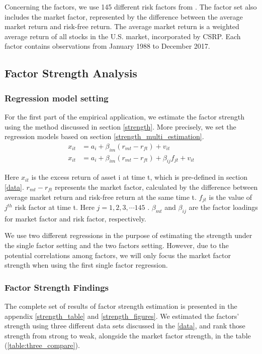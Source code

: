 Concerning the factors, we use 145 different risk factors from .
The factor set also includes the market factor, represented by the difference between the average market return and risk-free return.
The average market return is a weighted average return of all stocks in the U.S. market, incorporated by CSRP.
Each factor contains observations from January 1988 to December 2017.

\subsection{Factor Strength Analysis}

\subsubsection{Regression model setting}
For the first part of the empirical application, we estimate the factor strength using the method discussed in section \ref{strength}.
More precisely, we set the regression models based on section \ref{strength_multi_estimation}.
\begin{align*}
  x_{it} &= a_i + \beta_{im}(r_{mt} - r_{ft}) + v_{it} \\
 x_{it} &= a_i + \beta_{im}(r_{mt} - r_{ft}) + \beta_{ij}f_{jt} + v_{it} 
\end{align*}

Here $x_{it}$ is the excess return of asset i at time t, which is pre-defined in section \ref{data}.
$r_{mt} - r_{ft}$ represents the market factor, calculated by the difference between average market return and risk-free return at the same time t.
$f_{jt}$ is the value of $j^{th}$ risk factor  at time t. 
Here $j = 1, 2, 3,\cdots 145$ . 
$\beta_{mt}$ and $\beta_{ij}$ are the factor loadings for market factor and risk factor, respectively.

We use two different regressions in the purpose of estimating the strength under the single factor setting and the two factors setting.
However, due to the potential correlations among factors, we will only focus the market factor strength when using the first single factor regression.


	\subsubsection{Factor Strength Findings}
The complete set of results of factor strength estimation is presented in the appendix \ref{strength_table} and \ref{strength_figures}.
We estimated the factors' strength using three different data sets discussed in the \ref{data}, and rank those strength from strong to weak, alongside the market factor strength, in the table (\ref{table:three_compare}).

